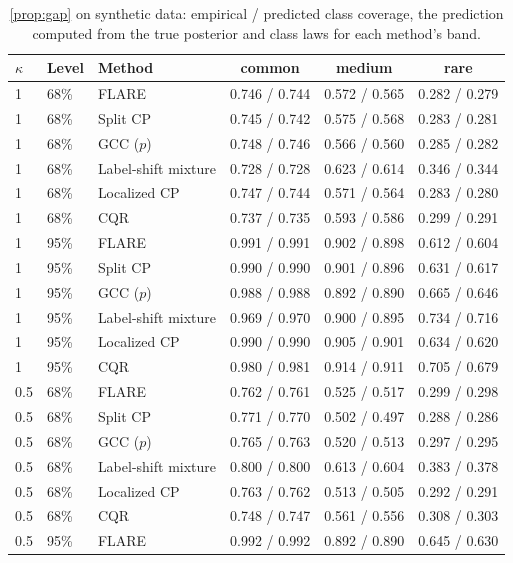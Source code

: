 \begin{table}[!htbp]
\centering
\caption{\cref{prop:gap} on synthetic data: empirical / predicted class coverage, the prediction computed from the true posterior and class laws for each method's band.}
\label{tab:prop2}
\scriptsize
\begin{tabular}{lllccc}
\toprule
$\kappa$ & Level & Method & common & medium & rare \\
\midrule
1 & 68\% & FLARE & 0.746 / 0.744 & 0.572 / 0.565 & 0.282 / 0.279 \\
1 & 68\% & Split CP & 0.745 / 0.742 & 0.575 / 0.568 & 0.283 / 0.281 \\
1 & 68\% & GCC ($p$) & 0.748 / 0.746 & 0.566 / 0.560 & 0.285 / 0.282 \\
1 & 68\% & Label-shift mixture & 0.728 / 0.728 & 0.623 / 0.614 & 0.346 / 0.344 \\
1 & 68\% & Localized CP & 0.747 / 0.744 & 0.571 / 0.564 & 0.283 / 0.280 \\
1 & 68\% & CQR & 0.737 / 0.735 & 0.593 / 0.586 & 0.299 / 0.291 \\
\midrule
1 & 95\% & FLARE & 0.991 / 0.991 & 0.902 / 0.898 & 0.612 / 0.604 \\
1 & 95\% & Split CP & 0.990 / 0.990 & 0.901 / 0.896 & 0.631 / 0.617 \\
1 & 95\% & GCC ($p$) & 0.988 / 0.988 & 0.892 / 0.890 & 0.665 / 0.646 \\
1 & 95\% & Label-shift mixture & 0.969 / 0.970 & 0.900 / 0.895 & 0.734 / 0.716 \\
1 & 95\% & Localized CP & 0.990 / 0.990 & 0.905 / 0.901 & 0.634 / 0.620 \\
1 & 95\% & CQR & 0.980 / 0.981 & 0.914 / 0.911 & 0.705 / 0.679 \\
\midrule
0.5 & 68\% & FLARE & 0.762 / 0.761 & 0.525 / 0.517 & 0.299 / 0.298 \\
0.5 & 68\% & Split CP & 0.771 / 0.770 & 0.502 / 0.497 & 0.288 / 0.286 \\
0.5 & 68\% & GCC ($p$) & 0.765 / 0.763 & 0.520 / 0.513 & 0.297 / 0.295 \\
0.5 & 68\% & Label-shift mixture & 0.800 / 0.800 & 0.613 / 0.604 & 0.383 / 0.378 \\
0.5 & 68\% & Localized CP & 0.763 / 0.762 & 0.513 / 0.505 & 0.292 / 0.291 \\
0.5 & 68\% & CQR & 0.748 / 0.747 & 0.561 / 0.556 & 0.308 / 0.303 \\
\midrule
0.5 & 95\% & FLARE & 0.992 / 0.992 & 0.892 / 0.890 & 0.645 / 0.630 \\

\end{tabular}
\end{table}
